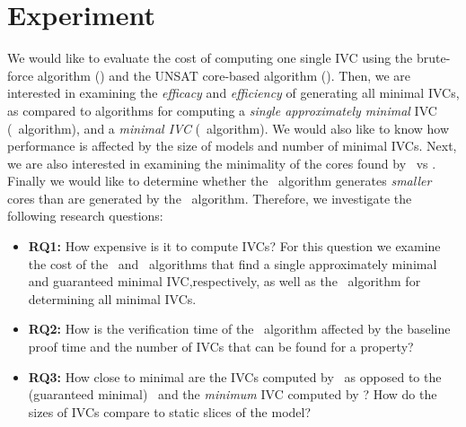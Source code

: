 \chapter{Experiment}
\label{ch:experiment}

\newcommand{\takeaway}[1]{
\vspace{6pt}
\noindent\fbox{\parbox{\textwidth}{#1}}
\vspace{6pt}
}
We would like to evaluate the cost of computing one single IVC using the brute-force
algorithm (\ucbfalg) and the UNSAT core-based algorithm (\ucalg).
Then, we are interested in examining the {\em efficacy} and {\em efficiency} of generating all minimal IVCs, as compared to algorithms for computing a {\em single approximately minimal} IVC (\ucalg\ algorithm), and a {\em minimal IVC} (\ucbfalg\ algorithm).  We would also like to know how performance is affected by the size of models and number of minimal IVCs.  Next, we are also interested in examining the minimality of the cores found by \ucbfalg\ vs  \ucalg . Finally we would like to determine whether the \aivcalg\ algorithm generates {\em smaller} cores than are generated by the \ucbfalg\ algorithm.  %
%
%
Therefore, we investigate the following research questions:
\begin{itemize}
  \item \textbf{RQ1:} How expensive is it to compute IVCs?  For this question we examine the cost of the \ucalg ~and \ucbfalg ~algorithms that find a single approximately minimal and guaranteed minimal IVC,respectively, as well as the \aivcalg ~algorithm for determining all minimal IVCs.
  \item \textbf{RQ2:} How is the verification time of the \aivcalg ~algorithm affected by the baseline proof time and the number of IVCs that can be found for a property?
   \item \textbf{RQ3:} How close to minimal are the IVCs computed by \ucalg\ as opposed to the (guaranteed minimal) \ucbfalg\ and the \emph{minimum} IVC computed by \aivcalg ?  How do the sizes of IVCs compare to static slices of the model?
%
\end{itemize}


